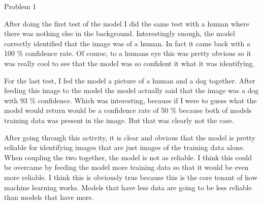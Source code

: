 \begin{problem}{Problem 1}
\begin{highlight}[Solution]
        After doing the first test of the model I did the same test with a human where there was nothing else in the background. Interestingly enough, the model correctly identified that the image
        was of a human. In fact it came back with a 100 \% confidence rate. Of course, to a humans eye this was pretty obvious so it was really cool to see that the model was so confident it what it was
        identifying.

        For the last test, I fed the model a picture of a human and a dog together. After feeding this image to the model the model actually said that the image was a dog with 93 \% confidence. Which
        was interesting, because if I were to guess what the model would return would be a confidence rate of 50 \% because both of models training data was present in the image. But that was clearly not
        the case.

        After going through this activity, it is clear and obvious that the model is pretty reliable for identifying images that are just images of the training data alone. When coupling the two together,
        the model is not as reliable. I think this could be overcame by feeding the model more training data so that it would be even more reliable. I think this is obviously true because this is the core
        tenant of how machine learning works. Models that have less data are going to be less reliable than models that have more.
    \end{highlight}
\end{problem}

